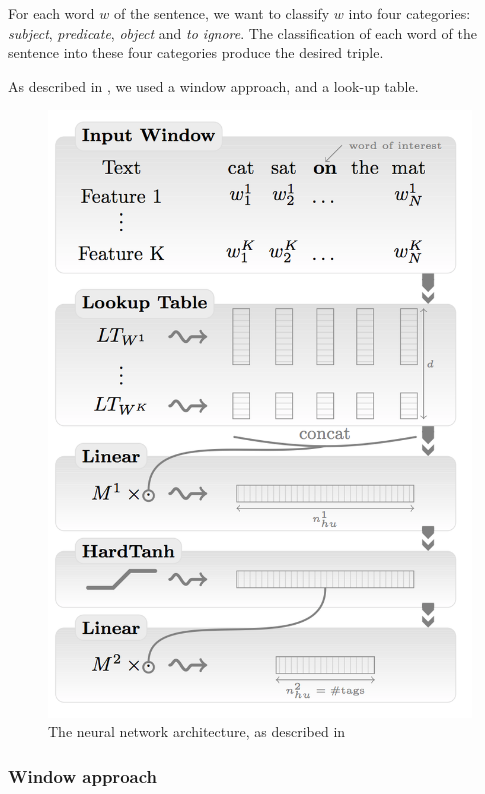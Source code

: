 For each word $w$ of the sentence, we want to classify $w$ into four categories: \textit{subject}, \textit{predicate}, \textit{object} and \textit{to ignore}.
The classification of each word of the sentence into these four categories produce the desired triple.

As described in \cite{collobert}, we used a window approach, and a look-up table.

\begin{figure}[!ht]
  \centering
  \caption{The neural network architecture, as described in \cite{collobert}}
  \label{sandalone:tree_four}
    \includegraphics[scale=0.5]{../NLP-standalone-images/network.png}
\end{figure}

\subsubsection{Window approach}

